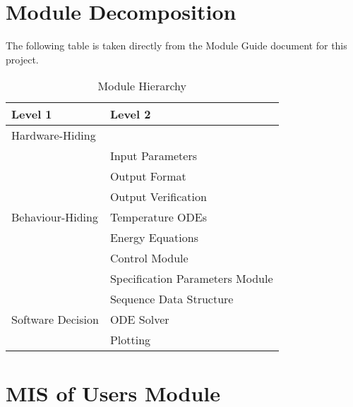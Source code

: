 \documentclass[12pt, titlepage]{article}
\begin{document}
\section{Module Decomposition}

The following table is taken directly from the Module Guide document for this project.

\begin{table}[h!]
	\centering
	\begin{tabular}{p{} p{}}
		\toprule
		\textbf{Level 1}                               & \textbf{Level 2}                \\
		\midrule

		{Hardware-Hiding}                              & ~                               \\
		\midrule

		\multirow{7}{0.3\textwidth}{Behaviour-Hiding}  & Input Parameters                \\
		                                               & Output Format                   \\
		                                               & Output Verification             \\
		                                               & Temperature ODEs                \\
		                                               & Energy Equations                \\
		                                               & Control Module                  \\
		                                               & Specification Parameters Module \\
		\midrule

		\multirow{3}{0.3\textwidth}{Software Decision} & {Sequence Data Structure}       \\
		                                               & ODE Solver                      \\
		                                               & Plotting                        \\
		\bottomrule

	\end{tabular}
	\caption{Module Hierarchy}
	\label{TblMH}
\end{table}

\section{MIS of Users Module} \label{mUsers}
\end{document}
